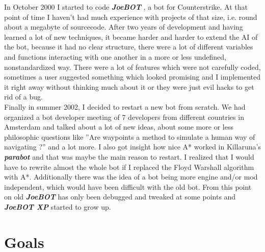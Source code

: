 \documentclass[12pt]{article}
\newcommand {\joebotxp}{\textit{\textbf{JoeBOT XP}} }
\newcommand {\joebot}{\textit{\textbf{JoeBOT}} }
\begin{document}
In October 2000 I started to code \joebot, a bot for Counterstrike. At that point of time I haven't had much experience with projects of that size, i.e. round about a megabyte of sourcecode. After two years of development and having learned a lot of new techniques, it became harder and harder to extend the AI of the bot, because it had no clear structure, there were a lot of different variables and functions interacting with one another in a more or less undefined, nonstandardized way. There were a lot of features which were not carefully coded, sometimes a user suggested something which looked promising and I implemented it right away without thinking much about it or they were just evil hacks to get rid of a bug.\\
Finally in summer 2002, I decided to restart a new bot from scratch. We had organized a bot developer meeting of 7 developers from different countries in Amsterdam and talked about a lot of new ideas, about some more or less philosophic questions like ''Are waypoints a method to simulate a human way of navigating ?'' and a lot more. I also got insight how nice A* worked in Killaruna's \textit{\textbf{parabot}} and that was maybe the main reason to restart. I realized that I would have to rewrite almost the whole bot if I replaced the Floyd Warshall algorithm with A*. Additionally there was the idea of a bot being more engine and/or mod independent, which would have been difficult with the old bot. From this point on old \joebot has only been debugged and tweaked at some points and \joebotxp started to grow up.

\section{Goals}
\end{document}
